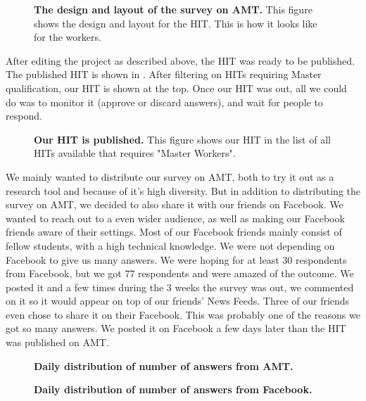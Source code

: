 \begin{figure}[h!]
\centering
{}
\caption[The design and layout of the survey on AMT]{\textbf{The design and layout of the survey on AMT.} This figure shows the design and layout for the HIT. This is how it looks like for the workers.} 
\label{fig:amtlayout}
\end{figure}

After editing the project as described above, the HIT was ready to be published. The published HIT is shown in . After filtering on HITs requiring Master qualification, our HIT is shown at the top. 
Once our HIT was out, all we could do was to monitor it (approve or discard answers), and wait for people to respond. 

\begin{figure}[h!]
\centering
{}
\caption[Our HIT is published]{\textbf{Our HIT is published.} This figure shows our HIT in the list of all HITs available that requires "Master Workers".} 
\label{fig:hitout}
\end{figure}

We mainly wanted to distribute our survey on AMT, both to try it out as a research tool and because of it's high diversity. But in addition to distributing the survey on AMT, we decided to also share it with our friends on Facebook. We wanted to reach out to a even wider audience, as well as making our Facebook  friends aware of their settings. Most of our Facebook friends mainly consist of fellow students, with a high technical knowledge. We were not depending on Facebook to give us many answers. We were hoping for at least 30 respondents from Facebook, but we got 77 respondents and were amazed of the outcome. We posted it and a few times during the 3 weeks the survey was out, we commented on it so it would appear on top of our friends' News Feeds. Three of our friends even chose to share it on their Facebook. This was probably one of the reasons we got so many answers. We posted it on Facebook a few days later than the HIT was published on AMT.  

\begin{figure}[h!]
\centering
{}
\caption[Daily distribution of number of answers from AMT]{\textbf{Daily distribution of number of answers from AMT.}} 
\label{fig:answersamt}
\end{figure}

\begin{figure}[h!]
\centering
{}
\caption[Daily distribution of number of answers from Facebook]{\textbf{Daily distribution of number of answers from Facebook.}} 
\label{fig:answersfacebook}
\end{figure}

